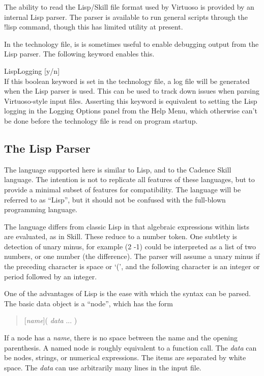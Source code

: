The ability to read the Lisp/Skill file format used by Virtuoso is
provided by an internal Lisp parser.  The parser is available to run
general scripts through the {\cb !lisp} command, though this has
limited utility at present.

In the technology file, is is sometimes useful to enable debugging
output from the Lisp parser.  The following keyword enables this.

\begin{description}
\item{\vt LispLogging} [{\vt y/n}]\\
If this boolean keyword is set in the technology file, a log file will
be generated when the Lisp parser is used.  This can be used to track
down issues when parsing Virtuoso-style input files.  Asserting this
keyword is equivalent to setting the Lisp logging in the {\cb Logging
Options} panel from the {\cb Help Menu}, which otherwise can't be done
before the technology file is read on program startup.
\end{description}


\subsection{The Lisp Parser}
\label{lisp}
The language supported here is similar to Lisp, and to the Cadence
Skill language.  The intention is not to replicate all features of
these languages, but to provide a minimal subset of features for
compatibility.  The language will be referred to as ``Lisp'', but it
should not be confused with the full-blown programming language.

The language differs from classic Lisp in that algebraic expressions
within lists are evaluated, as in Skill.  These reduce to a number
token.  One subtlety is detection of unary minus, for example {\vt (2
-1)} could be interpreted as a list of two numbers, or one number
(the difference).  The parser will assume a unary minus if the
preceding character is space or `{\vt (}', and the following
character is an integer or period followed by an integer.

One of the advantages of Lisp is the ease with which the syntax
can be parsed.  The basic data object is a ``node'', which has the form
\begin{quote}
[{\it name\/}]( {\it data} ... )
\end{quote}
If a node has a {\it name}, there is no space between the name and the
opening parenthesis.  A named node is roughly equivalent to a function
call.  The {\it data} can be nodes, strings, or numerical expressions. 
The items are separated by white space.  The {\it data} can use
arbitrarily many lines in the input file.

